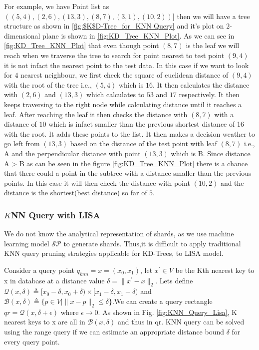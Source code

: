 \begin{mscexample}
	For example, we have Point list as $((5,4),(2,6),(13,3),(8,7),(3,1),(10,2))]$ then we will have a tree structure as shown in \ref{fig:$K$D-Tree_for_KNN Query} and it's plot on $2$-dimensional plane is shown in \ref{fig:KD_Tree_KNN_Plot}. As we can see in \ref{fig:KD_Tree_KNN_Plot} that even though point $(8,7)$ is the leaf we will reach when we traverse the tree to search for point nearest to test point $(9,4)$ it is not infact the nearest point to the test data. In this case if we want to look for $4$ nearest neighbour, we first check the square of euclidean distance of $(9,4)$ with the root of the tree i.e., $(5,4)$ which is $16$. It then calculates the distance with $(2,6)$ and $(13,3)$ which calculates to $53$ and $17$ respectively. It then keeps traversing to the right node while calculating distance until it reaches a leaf. After reaching the leaf it then checks the distance with $(8,7)$ with a distance of $10$ which is infact smaller than the previous shortest distance of 16 with the root. It adds these points to the list. It then makes a decision weather to go left from $(13,3)$ based on the distance of the test point with leaf $(8,7)$ i.e., A and the perpendicular distance with point $(13,3)$ which is B. Since distance A > B as can be seen in the figure \ref{fig:KD_Tree_KNN_Plot} there is a chance that there could a point in the subtree with a distance smaller than the previous points. In this case it will then check the distance with point $(10,2)$ and the distance is the shortest(best distance) so far of $5$. 
\end{mscexample}



\subsubsection{$K$NN Query with LISA}
We do not know the analytical representation of shards, as we use machine learning model $ \mathcal{SP}$ to generate shards. Thus,it is difficult to apply traditional KNN query pruning strategies applicable for KD-Trees, to LISA model. 

Consider a query point $q_{knn}=x=(x_{0},x_{1})$, let $x^{'} \in V$ be the Kth nearest key to x in database at a distance value $\delta = \| x^{'}-x\|_{2} $. Lets define $ \mathcal{Q}(x,\delta) \triangleq [x_{0}-\delta, x_{0}+\delta) \times[x_{1}-\delta, x_{1}+\delta)$ and $\mathcal{B}(x, \delta)  \triangleq \{p \in V \mid \| x-p\|_{2} \leq \delta \} $.We can create a query rectangle $qr =  \mathcal{Q}(x, \delta + \epsilon)$ where $\epsilon \rightarrow 0$. As shown in Fig. \ref{fig:KNN_Query_Lisa}, K nearest keys to x are all in $\mathcal{B}(x, \delta)$ and thus in qr. KNN query can be solved using the range query if we can estimate an appropriate distance bound $\delta$ for every query point.

